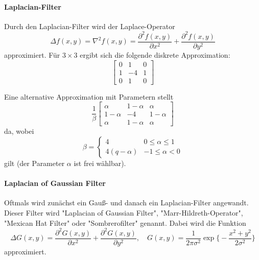 				\paragraph{Laplacian-Filter}
					Durch den Laplacian-Filter wird der Laplace-Operator
					\begin{equation*}
						\Delta f(x, y) = \nabla^2 f(x, y) = \frac{\partial^2 f(x, y)}{\partial x^2} + \frac{\partial^2 f(x, y)}{\partial y^2}
					\end{equation*}
					approximiert. Für \( 3 \times 3 \) ergibt sich \bspw die folgende diskrete Approximation:
					\begin{equation*}
						\begin{bmatrix}
							0 & 1  & 0 \\
							1 & -4 & 1 \\
							0 & 1  & 0
						\end{bmatrix}
					\end{equation*}

					Eine alternative Approximation mit Parametern stellt
					\begin{equation*}
						\frac{1}{\beta}
						\begin{bmatrix}
							\alpha     & 1 - \alpha & \alpha     \\
							1 - \alpha & -4         & 1 - \alpha \\
							\alpha     & 1 - \alpha & \alpha
						\end{bmatrix}
					\end{equation*}
					da, wobei
					\begin{equation*}
						\beta =
						\begin{cases}
							4             & 0 \leq \alpha \leq 1 \\
							4(q - \alpha) & -1 \leq \alpha < 0
						\end{cases}
					\end{equation*}
					gilt (der Parameter \( \alpha \) ist frei wählbar).

				\paragraph{Laplacian of Gaussian Filter}
					Oftmals wird zunächst ein Gauß- und danach ein Laplacian-Filter angewandt. Dieser Filter wird "Laplacian of Gaussian Filter", "Marr-Hildreth-Operator", "Mexican Hat Filter" oder "Sombrerofilter" genannt. Dabei wird die Funktion
					\begin{equation*}
						\Delta G(x, y) = \frac{\partial^2 G(x, y)}{\partial x^2} + \frac{\partial^2 G(x, y)}{\partial y^2},\quad G(x, y) = \frac{1}{2\pi\sigma^2} \exp \Bigg\{ -\frac{x^2 + y^2}{2\sigma^2} \Bigg\}
					\end{equation*}
					approximiert.

